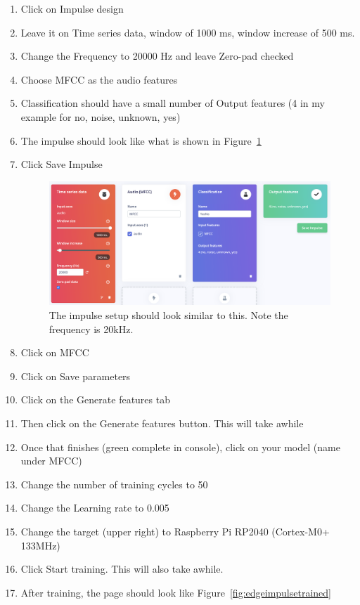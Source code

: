 \begin{enumerate}
  \item Click on Impulse design
  \item Leave it on Time series data, window of 1000 ms, window increase of 500 ms.
  \item Change the Frequency to 20000 Hz and leave Zero-pad checked
  \item Choose MFCC as the audio features
  \item Classification should have a small number of Output features 
          (4 in my example for no, noise, unknown, yes)
  \item The impulse should look like what is shown in Figure~\ref{fig:edgeimpulseimpulse}
  \item Click Save Impulse

  \begin{figure}[!htb]
    \centering
    \includegraphics[scale=0.3]{machineLearning/Impulse.png}
    \caption{The impulse setup should look similar to this. Note the frequency is 20kHz.}
    \label{fig:edgeimpulseimpulse}
  \end{figure} 

  \item Click on MFCC
  \item Click on Save parameters
  \item Click on the Generate features tab
  \item Then click on the Generate features button. This will take awhile
  \item Once that finishes (green complete in console), click on your model 
          (name under MFCC)
  \item Change the number of training cycles to 50
  \item Change the Learning rate to 0.005
  \item Change the target (upper right) to Raspberry Pi RP2040 (Cortex-M0+ 133MHz)
  \item Click Start training. This will also take awhile. 
  \item After training, the page should look like Figure~\ref{fig:edgeimpulsetrained}


\end{enumerate}
